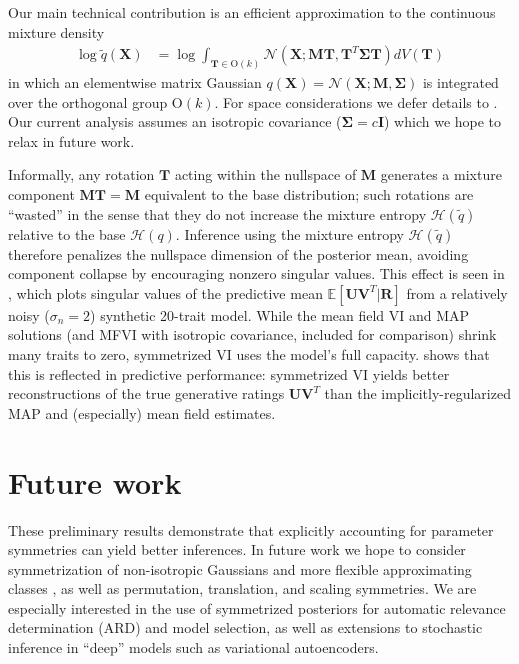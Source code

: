 \documentclass{article}
\newcommand{\N}{\mathcal{N}}
\newcommand{\E}{\mathbb{E}}
\renewcommand{\O}{\text{O}}
\renewcommand{\v}[1]{\mathbf{#1}}
\newcommand{\I}{\v{I}}
\begin{document}
\vspace{-0.5em}
Our main technical contribution is an efficient approximation to the continuous mixture density
\begin{align*}
\log \tilde{q}(\v{X}) &= \log \int_{\v{T}\in \O(k)} \N(\v{X}; \v{M}\v{T}, \v{T}^T\v{\Sigma} \v{T}) dV(\v{T})
\end{align*}
in which an elementwise matrix Gaussian $q(\v{X})=\N(\v{X}; \v{M}, \v{\Sigma})$ is
integrated over the orthogonal group $\O(k)$. For space considerations
we defer details to . Our current analysis assumes an isotropic covariance ($\v{\Sigma}=c\I$)
which we hope to relax in future work. 

Informally, any rotation $\v{T}$ acting within the nullspace of $\v{M}$
generates a mixture component $\v{M}\v{T}=\v{M}$ equivalent to the base distribution;
such rotations are ``wasted'' in the sense that they do not increase
the mixture entropy $\mathcal{H}(\tilde{q})$ relative to the base
$\mathcal{H}(q)$. Inference using the mixture entropy $\mathcal{H}(\tilde{q})$
therefore penalizes the nullspace dimension of the posterior mean, avoiding component collapse by encouraging nonzero singular values. This effect is seen in , which plots
singular values of the predictive mean $\E[\v{U}\v{V}^T | \v{R}]$ from a relatively noisy
($\sigma_n=2$) synthetic 20-trait model. While the mean field VI and MAP
solutions (and MFVI with isotropic covariance, included
for comparison) shrink many traits to zero, symmetrized VI uses
the model's full capacity.  shows that this is
reflected in predictive performance: symmetrized VI yields better
reconstructions of the true
generative ratings $\v{U}\v{V}^T$ than the implicitly-regularized MAP
and (especially) mean field estimates. 

\section{Future work}
\vspace{-0.5em}
These preliminary results demonstrate that explicitly accounting for
parameter symmetries can yield better inferences. In future work we
hope to consider symmetrization of non-isotropic Gaussians and
more flexible approximating classes
\citep{salimans2015markov,rezende2015variational,tran2016variational},
as well as permutation, translation, and scaling symmetries. We are
especially interested in the use of symmetrized posteriors for
automatic relevance determination (ARD) and model selection,
as well as extensions to stochastic inference in ``deep'' models
such as variational autoencoders.
\end{document}
